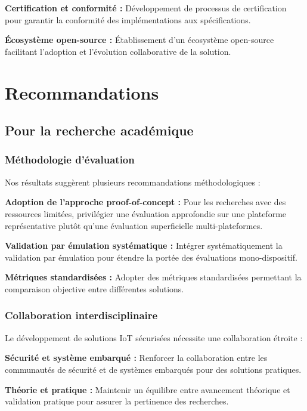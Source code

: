 \textbf{Certification et conformité :} Développement de processus de certification pour garantir la conformité des implémentations aux spécifications.

\textbf{Écosystème open-source :} Établissement d'un écosystème open-source facilitant l'adoption et l'évolution collaborative de la solution.

\section{Recommandations}

\subsection{Pour la recherche académique}

\subsubsection{Méthodologie d'évaluation}

Nos résultats suggèrent plusieurs recommandations méthodologiques :

\textbf{Adoption de l'approche proof-of-concept :} Pour les recherches avec des ressources limitées, privilégier une évaluation approfondie sur une plateforme représentative plutôt qu'une évaluation superficielle multi-plateformes.

\textbf{Validation par émulation systématique :} Intégrer systématiquement la validation par émulation pour étendre la portée des évaluations mono-dispositif.

\textbf{Métriques standardisées :} Adopter des métriques standardisées permettant la comparaison objective entre différentes solutions.

\subsubsection{Collaboration interdisciplinaire}

Le développement de solutions IoT sécurisées nécessite une collaboration étroite :

\textbf{Sécurité et système embarqué :} Renforcer la collaboration entre les communautés de sécurité et de systèmes embarqués pour des solutions pratiques.

\textbf{Théorie et pratique :} Maintenir un équilibre entre avancement théorique et validation pratique pour assurer la pertinence des recherches.

